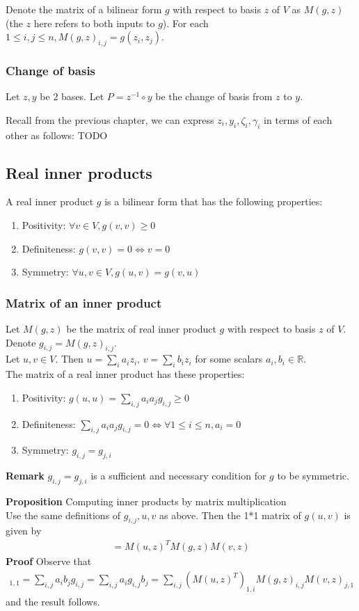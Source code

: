 \documentclass{article}
\begin{document}
Denote the matrix of a bilinear form $g$ with respect to basis $z$ of $V$ as $M(g, z)$ (the $z$ here refers to both inputs to $g$).
For each $1\leq i,j\leq n, M(g,z)_{i,j}=g(z_i,z_j)$.

\subsubsection{Change of basis}
Let $z,y$ be 2 bases. Let $P=z^{-1}\circ y$ be the change of basis from $z$ to $y$.

Recall from the previous chapter, we can express $z_i,y_i,\zeta_i,\gamma_i$ in terms of each other as follows:
TODO


\subsection{Real inner products}
A real inner product $g$ is a bilinear form that has the following properties:
\begin{enumerate}
	\item Positivity: $\forall v\in V, g(v,v)\geq 0$
	\item Definiteness: $g(v,v)=0\iff v=0$
	\item Symmetry: $\forall u,v\in V, g(u,v)=g(v,u)$
\end{enumerate}
\subsubsection{Matrix of an inner product}
Let $M(g,z)$ be the matrix of real inner product $g$ with respect to basis $z$ of $V$. Denote $g_{i,j}=M(g,z)_{i,j}$.\\
Let $u,v\in V$. Then $u=\sum_i a_iz_i,\, v=\sum_i b_iz_i$ for some scalars $a_i,b_i\in \mathbb{R}$.\\
The matrix of a real inner product has these properties:
\begin{enumerate}
	\item Positivity: $g(u,u)=\sum_{i,j} a_ia_j g_{i,j}\geq 0$
	\item Definiteness: $\sum_{i,j} a_ia_j g_{i,j}=0 \iff \forall 1\leq i\leq n, a_i=0$
	\item Symmetry: $g_{i,j}=g_{j,i}$
\end{enumerate}
\textbf{Remark} $g_{i,j}=g_{j,i}$ is a sufficient and necessary condition for $g$ to be symmetric.

\textbf{Proposition} Computing inner products by matrix multiplication\\
Use the same definitions of $g_{i,j},u,v$ as above. Then the 1*1 matrix of $g(u,v)$ is given by
\begin{align*}
	[g(u,v)] = M(u,z)^TM(g,z)M(v,z)
\end{align*}
\textbf{Proof} Observe that 
\begin{align*}
	[g(u,v)]_{1,1} = \sum_{i,j}a_ib_j g_{i,j} = \sum_{i,j}a_ig_{i,j}b_j = \sum_{i,j}(M(u,z)^T)_{1,i} M(g,z)_{i,j} M(v,z)_{j,1}
\end{align*}
and the result follows.
\end{document}
